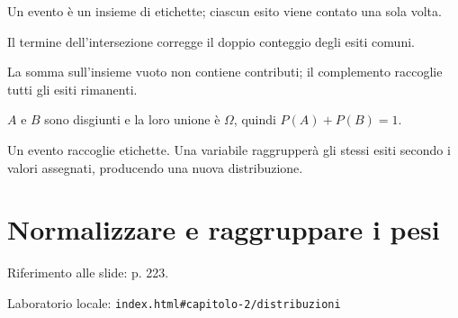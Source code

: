 Un evento è un insieme di etichette; ciascun esito viene contato una sola volta.\par


\label{c2-eventi-example-2-step-3}


Il termine dell'intersezione corregge il doppio conteggio degli esiti comuni.\par


\label{c2-eventi-example-2-step-4}


La somma sull'insieme vuoto non contiene contributi; il complemento raccoglie tutti gli esiti rimanenti.\par



\(A\) e \(B\) sono disgiunti e la loro unione è \(\Omega \), quindi \(P(A)+P(B)=1\).\par


Un evento raccoglie etichette. Una variabile raggrupperà gli stessi esiti secondo i valori assegnati, producendo una nuova distribuzione.\par


\Needspace{.43\textheight}
\section{Normalizzare e raggruppare i pesi}
\label{c2-distribuzioni}

{\sffamily\small\color{Ink!70} Riferimento alle slide: p. 223.\par}

{\sffamily\small\color{Ink!70} Laboratorio locale: \nolinkurl{index.html#capitolo-2/distribuzioni}\par}

